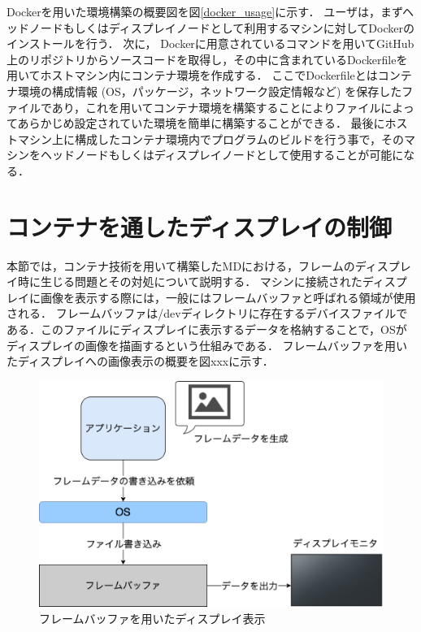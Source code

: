 Dockerを用いた環境構築の概要図を図\ref{docker_usage}に示す．
ユーザは，まずヘッドノードもしくはディスプレイノードとして利用するマシンに対してDockerのインストールを行う．
次に， Dockerに用意されているコマンドを用いてGitHub \cite{github}上のリポジトリからソースコードを取得し，その中に含まれているDockerfileを用いてホストマシン内にコンテナ環境を作成する．
ここでDockerfileとはコンテナ環境の構成情報 (OS，パッケージ，ネットワーク設定情報など) を保存したファイルであり，これを用いてコンテナ環境を構築することによりファイルによってあらかじめ設定されていた環境を簡単に構築することができる．
最後にホストマシン上に構成したコンテナ環境内でプログラムのビルドを行う事で，そのマシンをヘッドノードもしくはディスプレイノードとして使用することが可能になる．

\section{コンテナを通したディスプレイの制御}
本節では，コンテナ技術を用いて構築したMDにおける，フレームのディスプレイ時に生じる問題とその対処について説明する．
マシンに接続されたディスプレイに画像を表示する際には，一般にはフレームバッファと呼ばれる領域が使用される．
フレームバッファは/devディレクトリに存在するデバイスファイルである．このファイルにディスプレイに表示するデータを格納することで，OSがディスプレイの画像を描画するという仕組みである．
フレームバッファを用いたディスプレイへの画像表示の概要を図xxxに示す．

\begin{figure}[H]
    \hspace*{\fill}
    \includegraphics[width=\linewidth]{./fig/chap3/framebuffer.eps}
    \hspace*{\fill}
    \caption{フレームバッファを用いたディスプレイ表示}
\end{figure}

